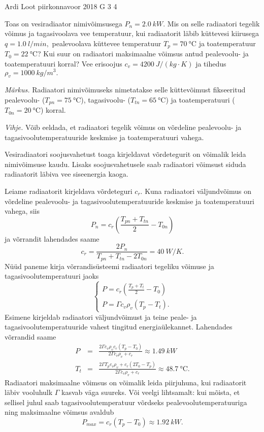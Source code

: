 {Ardi Loot} %
{piirkonnavoor} %
{2018} %
{G 3} %
{4} %
{
\ifStatement
Toas on vesiradiaator nimivõimsusega $P_{n}=\SI{2.0}{kW}.$ Mis on
selle radiaatori tegelik võimus ja tagasivoolava vee temperatuur,
kui radiaatorit läbib küttevesi kiirusega $q=\SI{1.0}{l/min},$
pealevoolava küttevee temperatuur $T_{p}=\SI{70}{\celsius}$ ja toatemperatuur
$T_{0}=\SI{22}{\celsius}$? Kui suur on radiaatori maksimaalne võimsus
antud pealevoolu- ja toatemperatuuri korral? Vee erisoojus $c_{v}=\SI{4200}{J/\left(kg\cdot K\right)}$
ja tihedus $\rho_{v}=\SI{1000}{kg/m^{3}}.$

\emph{Märkus.} Radiaatori nimivõimuseks nimetatakse selle küttevõimust fikseeritud\\
pealevoolu- ($T_{pn}=\SI{75}{\celsius}$), tagasivoolu- ($T_{tn}=\SI{65}{\celsius}$)
ja toatemperatuuri ($T_{0n}=\SI{20}{\celsius}$) korral.

\emph{Vihje.} Võib eeldada, et radiaatori tegelik võimus on võrdeline pealevoolu-
ja tagasivoolutemperatuuride keskmise ja toatemperatuuri vahega.
\fi


\ifHint
Vesiradiaatori soojusvahetust toaga kirjeldavat võrdetegurit on võimalik leida nimivõimsuse kaudu. Lisaks soojusvahetusele saab radiaatori võimsust siduda radiaatorit läbiva vee siseenergia kaoga.
\fi


\ifSolution
Leiame radiaatorit kirjeldava võrdeteguri $c_{r}$. Kuna radiaatori
väljundvõimus on võrdeline pealevoolu- ja tagasivoolutemperatuuride
keskmise ja toatemperatuuri vahega, siis
\[
P_{n}=c_{r}\left(\frac{T_{pn}+T_{tn}}{2}-T_{0n}\right)
\]
\noindent ja võrrandit lahendades saame
\[
c_{r}=\frac{2P_{n}}{T_{pn}+T_{tn}-2T_{0n}}=\SI{40}{W/K}.
\]
Nüüd paneme kirja võrrandisüsteemi radiaatori tegeliku võimuse ja
tagasivoolutemperatuuri jaoks
\[
\left\{ \begin{array}{c}
P=c_{r}\left(\frac{T_{p}+T_{t}}{2}-T_{0}\right)\\
P=\Gamma c_{v}\rho_{v}\left(T_{p}-T_{t}\right).
\end{array}\right.
\]
Esimene kirjeldab radiaatori väljundvõimust ja teine peale- ja tagasivoolutemperatuuride
vahest tingitud energiaülekannet. Lahendades võrrandid saame 
\begin{eqnarray*}
P & = & \frac{2\Gamma c_{v}\rho_{v}c_{r}\left(T_{p}-T_{0}\right)}{2\Gamma c_{v}\rho_{v}+c_{r}}\approx\SI{1.49}{kW}\\
T_{t} & = & \frac{2\Gamma T_{p}c_{v}\rho_{v}+c_{r}\left(2T_{0}-T_{p}\right)}{2\Gamma c_{v}\rho_{v}+c_{r}}\approx\SI{48.7}{\celsius}.
\end{eqnarray*}
Radiaatori maksimaalne võimsus on võimalik leida piirjuhuna, kui radiaatorit
läbiv vooluhulk $\Gamma$ kasvab väga suureks. Või veelgi lihtsamalt:
kui mõista, et sellisel juhul saab tagasivoolutemperatuur võrdseks
pealevoolutemperatuuriga ning maksimaalne võimsus avaldub
\[
P_{max}=c_{r}\left(T_{p}-T_{0}\right)\approx\SI{1.92}{kW}.
\]
\fi


}
